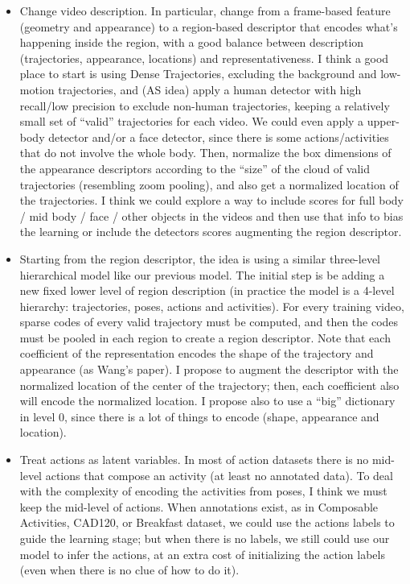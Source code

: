 \documentclass[10pt,letterpaper]{article}
\newcommand{\+}[1]{\ensuremath{{\boldsymbol #1}}}
\begin{document}
\begin{itemize}
\item Change video description. In particular, change from a frame-based feature (geometry and appearance) to a region-based descriptor that encodes what's happening inside the region, with a good balance between description (trajectories, appearance, locations) and representativeness. I think a good place to start is using Dense Trajectories, excluding the background and low-motion trajectories, and (AS idea) apply a human detector with high recall/low precision to exclude non-human trajectories, keeping a relatively small set of ``valid'' trajectories for each video. We could even apply a upper-body detector and/or a face detector, since there is some actions/activities that do not involve the whole body. Then, normalize the box dimensions of the appearance descriptors according to the ``size'' of the cloud of valid trajectories (resembling zoom pooling), and also get a normalized location of the trajectories. I think we could explore a way to include scores for full body / mid body / face / other objects in the videos and then use that info to bias the learning or include the detectors scores augmenting the region descriptor.
\item Starting from the region descriptor, the idea is using a similar three-level hierarchical model like our previous model. The initial step is be adding a new fixed lower level of region description (in practice the model is a 4-level hierarchy: trajectories, poses, actions and activities). For every training video, sparse codes of every valid trajectory must be computed, and then the codes must be pooled in each region to create a region descriptor. Note that each coefficient of the representation encodes the shape of the trajectory and appearance (as Wang's paper). I propose to augment the descriptor with the normalized location of the center of the trajectory; then, each coefficient also will encode the normalized location. I propose also to use a ``big'' dictionary in level 0, since there is a lot of things to encode (shape, appearance and location).   
\item Treat actions as latent variables. In most of action datasets there is no mid-level actions that compose an activity (at least no annotated data). To deal with the complexity of encoding the activities from poses, I think we must keep the mid-level of actions. When annotations exist, as in Composable Activities, CAD120, or Breakfast dataset, we could use the actions labels to guide the learning stage; but when there is no labels, we still could use our model to infer the actions, at an extra cost of initializing the action labels (even when there is no clue of how to do it). 

\end{itemize}
\end{document}
